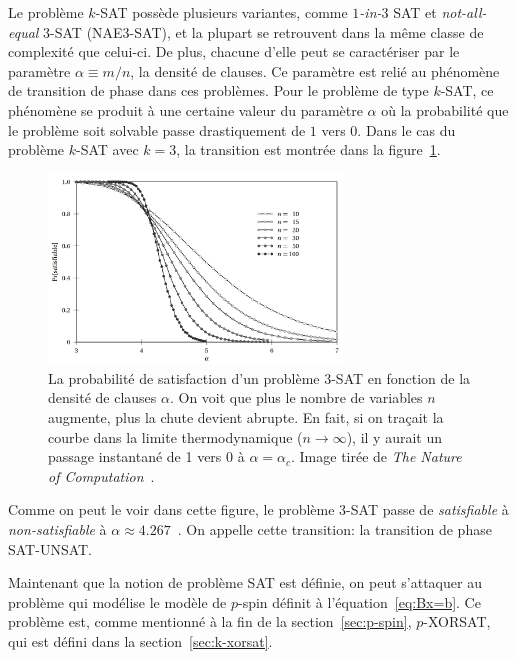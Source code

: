Le problème $k$-SAT possède plusieurs variantes, comme \textit{$1$-in-$3$} SAT et \textit{not-all-equal} 3-SAT (NAE3-SAT), et la plupart se retrouvent dans la même classe de complexité que celui-ci.
De plus, chacune d'elle peut se caractériser par le paramètre $\alpha \equiv m / n$, la densité de clauses.
Ce paramètre est relié au phénomène de transition de phase dans ces problèmes.
Pour le problème de type $k$-SAT, ce phénomène se produit à une certaine valeur du paramètre $\alpha$ où la probabilité que le problème soit solvable passe drastiquement de $1$ vers $0$.
Dans le cas du problème $k$-SAT avec $k = 3$, la transition est montrée dans la figure~\ref{fig:SAT_phase-transition}.
\begin{figure}[h]
    \centering
    \includegraphics[width=0.7\textwidth]{Figures/SAT_phase-transition.png}
    \caption[La probabilité de satisfaction d'un problème $3$-SAT en fonction de la densité de clauses $\alpha$. On voit que plus le nombre de variables $n$ augmente, plus la chute devient abrupte. En fait, si on traçait la courbe dans la limite thermodynamique ($n \rightarrow \infty$), il y aurait un passage instantané de 1 vers 0 à $\alpha = \alpha_c$.]{La probabilité de satisfaction d'un problème $3$-SAT en fonction de la densité de clauses $\alpha$. On voit que plus le nombre de variables $n$ augmente, plus la chute devient abrupte. En fait, si on traçait la courbe dans la limite thermodynamique ($n \rightarrow \infty$), il y aurait un passage instantané de 1 vers 0 à $\alpha = \alpha_c$. Image tirée de \emph{The Nature of Computation}~\protect\cite{moore_nature_2011}.}
    \label{fig:SAT_phase-transition}
\end{figure}
Comme on peut le voir dans cette figure, le problème $3$-SAT passe de \textit{satisfiable} à \textit{non-satisfiable} à $\alpha \approx 4.267$~\cite{moore_nature_2011}.
On appelle cette transition: la transition de phase SAT-UNSAT.

Maintenant que la notion de problème SAT est définie, on peut s'attaquer au problème qui modélise le modèle de $p$-spin définit à l'équation~\ref{eq:Bx=b}.
Ce problème est, comme mentionné à la fin de la section~\ref{sec:p-spin}, $p$-XORSAT, qui est défini dans la section~\ref{sec:k-xorsat}.


